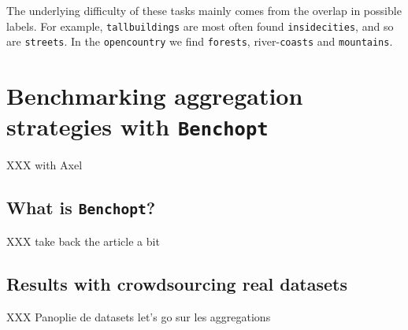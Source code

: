 The underlying difficulty of these tasks mainly comes from the overlap in possible labels. For example, \texttt{tallbuildings} are most often found \texttt{insidecities}, and so are \texttt{streets}. In the \texttt{opencountry} we find \texttt{forests}, river-\texttt{coasts} and \texttt{mountains}.



\section{Benchmarking aggregation strategies with \texttt{Benchopt}}
\label{sec:benchopt}
XXX with Axel
\subsection{What is \texttt{Benchopt}?}
XXX take back the article a bit

\subsection{Results with crowdsourcing real datasets}
XXX Panoplie de datasets let's go sur les aggregations